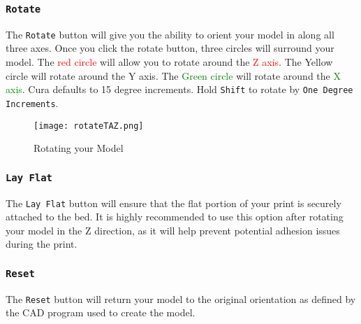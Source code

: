 \subsubsection{\texttt{Rotate}}
The \texttt{Rotate} button will give you the ability to orient your model in along all three axes. Once you click the rotate button, three circles will surround your model. The \textcolor{red}{red circle} will allow you to rotate around the \textcolor{red}{Z axis}. The \textcolor{yellow1}{Yellow circle} will rotate around the \textcolor{yellow1}{Y axis}. The \textcolor{green}{Green circle} will rotate around the \textcolor{green}{X axis}. Cura defaults to 15 degree increments. Hold \texttt{Shift} to rotate by \texttt{One Degree Increments}.
\begin{figure}[H]
\centering
\texttt{[image: rotateTAZ.png]}
\caption{Rotating your Model}
\label{fig:Rotating your Model}
\end{figure}

\subsubsection{\texttt{Lay Flat}}
The \texttt{Lay Flat} button will ensure that the flat portion of your print is securely attached to the bed. It is highly recommended to use this option after rotating your model in the Z direction, as it will help prevent potential adhesion issues during the print.

\subsubsection{\texttt{Reset}}
The \texttt{Reset} button will return your model to the original orientation as defined by the CAD program used to create the model.

